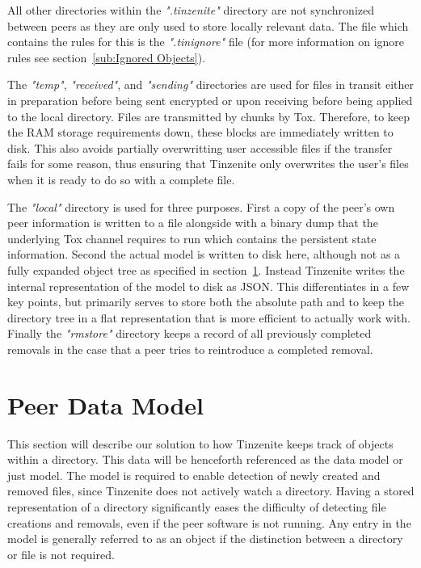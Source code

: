 All other directories within the \textit{".tinzenite"} directory are not synchronized between peers as they are only used to store locally relevant data.
The file which contains the rules for this is the \textit{".tinignore"} file (for more information on ignore rules see section~\ref{sub:Ignored Objects}).

The \textit{"temp"}, \textit{"received"}, and \textit{"sending"} directories are used for files in transit either in preparation before being sent encrypted or upon receiving before being applied to the local directory.
Files are transmitted by chunks by Tox.
Therefore, to keep the RAM storage requirements down, these blocks are immediately written to disk.
This also avoids partially overwritting user accessible files if the transfer fails for some reason, thus ensuring that Tinzenite only overwrites the user's files when it is ready to do so with a complete file.

The \textit{"local"} directory is used for three purposes.
First a copy of the peer's own peer information is written to a file alongside with a binary dump that the underlying Tox channel requires to run which contains the persistent state information.
Second the actual model is written to disk here, although not as a fully expanded object tree as specified in section~\ref{sec:Peer Data Model}.
Instead Tinzenite writes the internal representation of the model to disk as JSON.
This differentiates in a few key points, but primarily serves to store both the absolute path and to keep the directory tree in a flat representation that is more efficient to actually work with.
Finally the \textit{"rmstore"} directory keeps a record of all previously completed removals in the case that a peer tries to reintroduce a completed removal.

\section{Peer Data Model}
\label{sec:Peer Data Model}

This section will describe our solution to how Tinzenite keeps track of objects within a directory.
This data will be henceforth referenced as the data model or just model.
The model is required to enable detection of newly created and removed files, since Tinzenite does not actively watch a directory.
Having a stored representation of a directory significantly eases the difficulty of detecting file creations and removals, even if the peer software is not running.
Any entry in the model is generally referred to as an object if the distinction between a directory or file is not required.

